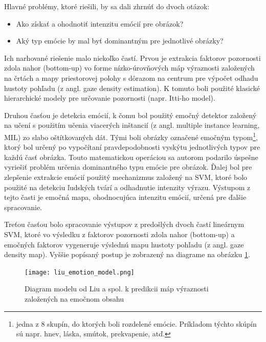 Hlavné problémy, ktoré riešili, by sa dali zhrnúť do dvoch otázok:
\begin{itemize}
	\item Ako získať a ohodnotiť intenzitu emócií pre obrázok?
	\item Aký typ emócie by mal byť dominantným pre jednotlivé obrázky?
\end{itemize}

Ich narhované riešenie malo niekoľko častí. Prvou je extrakcia faktorov pozornosti zdola nahor (bottom-up) vo forme nízko-úrovňových máp výraznosti založených na črtách a mapy priestorovej polohy s dôrazom na centrum pre výpočet odhadu hustoty pohľadu (z angl. gaze density estimation). K tomuto boli použité klasické hierarchické modely pre určovanie pozornosti (napr. Itti-ho model).

Druhou časťou je detekcia emócií, k čomu bol použitý emočný detektor založený na učení s použitím učenia viacerých inštancií (z angl. multiple instance learning, MIL) zo slabo oštítkovaných dát. Tými boli obrázky označené emočným typom\footnote{jedna z 8 skupín, do ktorých boli rozdelené emócie. Príkladom týchto skúpín sú napr. hnev, láska, smútok, prekvapenie, atď.}, ktorý bol určený po vypočítaní pravdepodobnosti vyskýtu jednotlivých typov pre každú časť obrázka. Touto matematickou operáciou sa autorom podarilo úspešne vyriešiť problém určenia dominantného typu emócie pre obrázok.  Ďalej bol pre zlepšenie extrakcie emócií použitý mechanizmus založený na SVM, ktoré bolo použité na detekciu ľudských tvárí a odhadnutie intenzity výrazu. Výstupom z tejto časti je emočná mapa, ohodnocujúca intenzitu emócií, určená pre ďalšie spracovanie.

Treťou časťou bolo spracovanie výstupov z predošlých dvoch častí lineárnym SVM, ktoré vo výsledku z faktorov pozornosti zdola nahor (bottom-up) a emočných faktorov vygeneruje výslednú mapu hustoty pohľadu (z angl. gaze density map). Vyššie popísaný postup je zobrazený na diagrame na obrázku \ref{liu_image}.

\begin{figure}[H]
	\begin{center}
		\texttt{[image: liu\_emotion\_model.png]}
		\caption[Diagram modelu k predikcii máp výraznosti založených na emočnom obsahu]{Diagram modelu od Liu a spol. k predikcii máp výraznosti založených na emočnom obsahu\cite{liu2016improving}\label{liu_image}}
	\end{center}
\end{figure}

